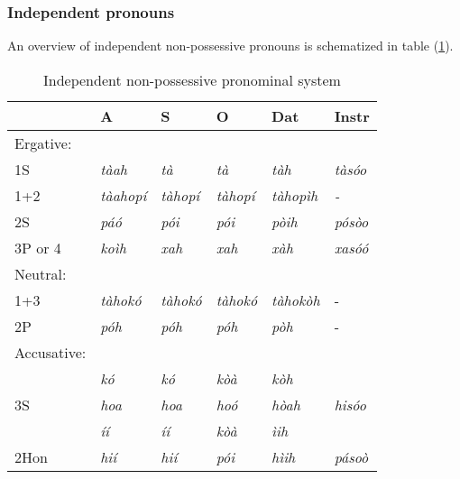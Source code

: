 \documentclass[a4paper, 12pt, oneside]{memoir}
\begin{document}
\subsubsection{Independent pronouns}
An overview of independent non-possessive pronouns is schematized in table (\ref{t:indeppron}).
\begin{table}[H]
\begin{centering}
    \begin{tabular}{@{}llllll@{}}
    \toprule
    \multicolumn{1}{c}{} & A                    & S                    & O                    & Dat              & Instr                  \\ \midrule
    Ergative:            & \multicolumn{1}{c}{} & \multicolumn{1}{c}{} & \multicolumn{1}{c}{} &                  & \multicolumn{1}{c}{}   \\
    1S                   & \textit{tàah}        & \textit{tà}          & \textit{tà}          & \textit{tàh}     & \textit{tàsóo}         \\
    1+2                  & \textit{tàahopí}     & \textit{tàhopí}      & \textit{tàhopí}      & \textit{tàhopìh} & \textit{-}             \\
    2S                   & \textit{páó}         & \textit{pói}         & \textit{pói}         & \textit{pòih}    & \textit{pósòo}         \\
    3P or 4              & \textit{koìh}        & \textit{xah}         & \textit{xah}         & \textit{xàh}     & \textit{xasóó}         \\
    Neutral:             &                      &                      &                      &                  &                        \\
    1+3                  & \textit{tàhokó}      & \textit{tàhokó}      & \textit{tàhokó}      & \textit{tàhokòh} & -                      \\
    2P                   & \textit{póh}         & \textit{póh}         & \textit{póh}         & \textit{pòh}     & -                      \\
    Accusative:          &                      &                      &                      &                  &                        \\
                         & \textit{kó}          & \textit{kó}          & \textit{kòà}         & \textit{kòh}     &                        \\
                      3S & \textit{hoa}         & \textit{hoa}         & \textit{hoó}         & \textit{hòah}    & \textit{hisóo}                  \\
                         & \textit{íí}          & \textit{íí}          & \textit{kòà}         & \textit{ìih}     &                        \\
    2Hon                 & \textit{hií}         & \textit{hií}         & \textit{pói}         & \textit{hìih}    & \textit{pásoò}         \\ \bottomrule
    \end{tabular}
    \caption{Independent non-possessive pronominal system
    }
    \label{t:indeppron}
\end{centering}
\end{table}
\end{document}
